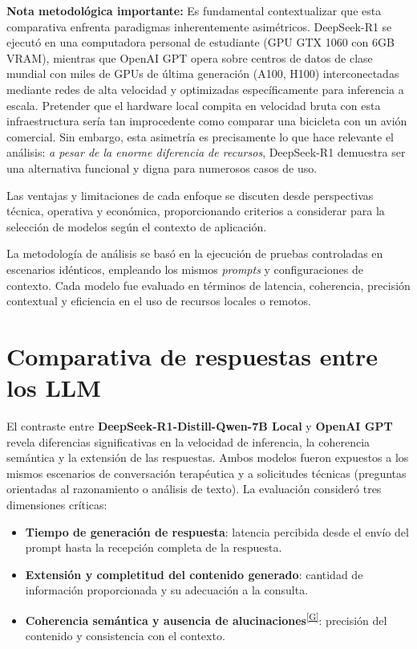 \documentclass[12pt,a4paper]{report}
\numberwithin{figure}{section}
\begin{document}
\textbf{Nota metodológica importante:} Es fundamental contextualizar que esta comparativa enfrenta paradigmas inherentemente asimétricos. DeepSeek-R1 se ejecutó en una computadora personal de estudiante (GPU GTX 1060 con 6GB VRAM), mientras que OpenAI GPT opera sobre centros de datos de clase mundial con miles de GPUs de última generación (A100, H100) interconectadas mediante redes de alta velocidad y optimizadas específicamente para inferencia a escala. Pretender que el hardware local compita en velocidad bruta con esta infraestructura sería tan improcedente como comparar una bicicleta con un avión comercial. Sin embargo, esta asimetría es precisamente lo que hace relevante el análisis: \textit{a pesar de la enorme diferencia de recursos}, DeepSeek-R1 demuestra ser una alternativa funcional y digna para numerosos casos de uso.

Las ventajas y limitaciones de cada enfoque se discuten desde perspectivas técnica, operativa y económica, proporcionando criterios a considerar para la selección de modelos según el contexto de aplicación.

La metodología de análisis se basó en la ejecución de pruebas controladas en escenarios idénticos, empleando los mismos \textit{prompts} y configuraciones de contexto.  
Cada modelo fue evaluado en términos de latencia, coherencia, precisión contextual y eficiencia en el uso de recursos locales o remotos.

\vspace{1em}

\section{Comparativa de respuestas entre los LLM}
\label{sec:comparativa_respuestas}

El contraste entre \textbf{DeepSeek-R1-Distill-Qwen-7B Local} y \textbf{OpenAI GPT} revela diferencias significativas en la velocidad de inferencia, la coherencia semántica y la extensión de las respuestas.  
Ambos modelos fueron expuestos a los mismos escenarios de conversación terapéutica y a solicitudes técnicas (preguntas orientadas al razonamiento o análisis de texto).  
La evaluación consideró tres dimensiones críticas:
\begin{itemize}
    \item \textbf{Tiempo de generación de respuesta}: latencia percibida desde el envío del prompt hasta la recepción completa de la respuesta.
    \item \textbf{Extensión y completitud del contenido generado}: cantidad de información proporcionada y su adecuación a la consulta.
    \item \textbf{Coherencia semántica y ausencia de alucinaciones}\textsuperscript{\hyperref[glos:alucinacion]{[G]}}: precisión del contenido y consistencia con el contexto.
\end{itemize}
\end{document}
